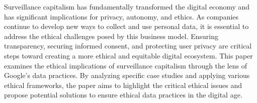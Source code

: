 Surveillance capitalism has fundamentally transformed the digital economy and has significant implications for privacy, autonomy, and ethics.
As companies continue to develop new ways to collect and use personal data, it is essential to address the ethical challenges posed by this business model.
Ensuring transparency, securing informed consent, and protecting user privacy are critical steps toward creating a more ethical and equitable digital ecosystem.
This paper examines the ethical implications of surveillance capitalism through the lens of Google's data practices.
By analyzing specific case studies and applying various ethical frameworks, the paper aims to highlight the critical ethical issues and propose potential solutions to ensure ethical data practices in the digital age.
\noindent
